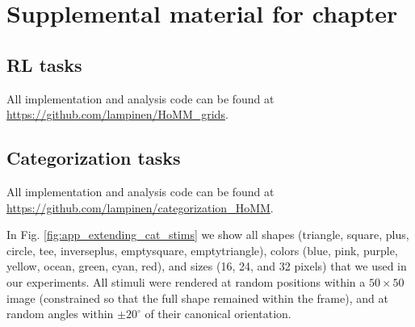 \chapter{Supplemental material for chapter } \label{appendix:extending}

\section{RL tasks} \label{app:extending_grids_methods}

All implementation and analysis code can be found at \url{https://github.com/lampinen/HoMM_grids}.\par

\section{Categorization tasks} \label{app:extending_categorization_methods}
All implementation and analysis code can be found at \url{https://github.com/lampinen/categorization_HoMM}.\par
In Fig. \ref{fig:app_extending_cat_stims} we show all shapes (triangle, square, plus, circle, tee, inverseplus, emptysquare, emptytriangle), colors (blue, pink, purple, yellow, ocean, green, cyan, red), and sizes (16, 24, and 32 pixels) that we used in our experiments. All stimuli were rendered at random positions within a \(50 \times 50\) image (constrained so that the full shape remained within the frame), and at random angles within \(\pm20^{\circ}\) of their canonical orientation.\par

